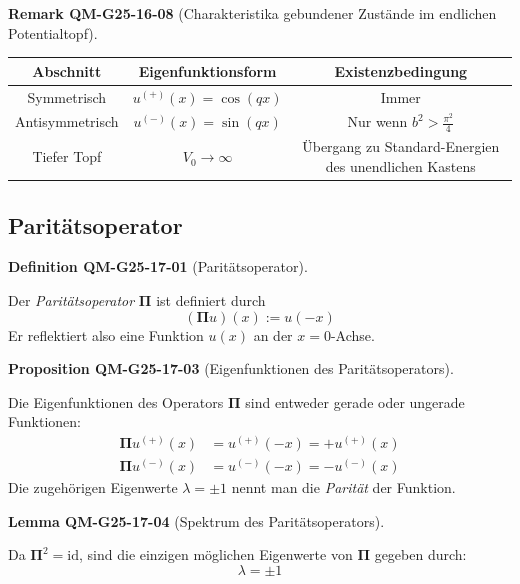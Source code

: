 \documentclass[10pt, letterpaper]{article}
\newcommand{\CustomHeading}[3]{%
  \par\medskip\noindent%
  \textbf{#1 #2} \textnormal{(#3)}.\enskip%
}
\newenvironment{DEF}[2]{\begin{unitbox}\CustomHeading{Definition}{#1}{#2}}{\end{unitbox}}
\newenvironment{PROP}[2]{\begin{unitbox}\CustomHeading{Proposition}{#1}{#2}}{\end{unitbox}}
\newenvironment{LEM}[2]{\begin{unitbox}\CustomHeading{Lemma}{#1}{#2}}{\end{unitbox}}
\newenvironment{REM}[2]{\begin{unitbox}\CustomHeading{Remark}{#1}{#2}}{\end{unitbox}}
\begin{document}
\begin{REM}{QM-G25-16-08}{Charakteristika gebundener Zustände im endlichen Potentialtopf}
\begin{tabular}{|c|c|c|}
\hline
\textbf{Abschnitt} & \textbf{Eigenfunktionsform} & \textbf{Existenzbedingung} \\
\hline
Symmetrisch & $u^{(+)}(x) = \cos(qx)$ & Immer \\
\hline
Antisymmetrisch & $u^{(-)}(x) = \sin(qx)$ & Nur wenn $b^2 > \frac{\pi^2}{4}$ \\
\hline
Tiefer Topf & $V_0 \to \infty$ & Übergang zu Standard-Energien des unendlichen Kastens \\
\hline
\end{tabular}
\end{REM}








\pagebreak



\subsection{Paritätsoperator}



\begin{DEF}{QM-G25-17-01}{Paritätsoperator}
Der \emph{Paritätsoperator} $\boldsymbol{\Pi}$ ist definiert durch
\[
(\boldsymbol{\Pi} u)(x) := u(-x)
\]
Er reflektiert also eine Funktion $u(x)$ an der $x=0$-Achse.
\end{DEF}



\begin{PROP}{QM-G25-17-03}{Eigenfunktionen des Paritätsoperators}
Die Eigenfunktionen des Operators $\boldsymbol{\Pi}$ sind entweder gerade oder ungerade Funktionen:
\[
\begin{aligned}
\boldsymbol{\Pi} u^{(+)}(x) &= u^{(+)}(-x) = +u^{(+)}(x) \\
\boldsymbol{\Pi} u^{(-)}(x) &= u^{(-)}(-x) = -u^{(-)}(x)
\end{aligned}
\]
Die zugehörigen Eigenwerte $\lambda = \pm 1$ nennt man die \emph{Parität} der Funktion.
\end{PROP}



\begin{LEM}{QM-G25-17-04}{Spektrum des Paritätsoperators}
Da $\boldsymbol{\Pi}^2 = \mathrm{id}$, sind die einzigen möglichen Eigenwerte von $\boldsymbol{\Pi}$ gegeben durch:
\[
\lambda = \pm 1
\]
\end{LEM}
\end{document}
